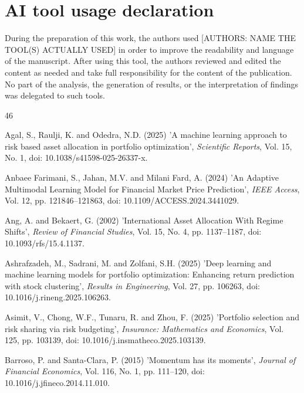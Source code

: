 \documentclass{singlecol-new}
\theoremstyle{TH}{
\newtheorem{lemma}{Lemma}
\newtheorem{theorem}[lemma]{Theorem}
\newtheorem{corrolary}[lemma]{Corrolary}
\newtheorem{conjecture}[lemma]{Conjecture}
\newtheorem{proposition}[lemma]{Proposition}
\newtheorem{claim}[lemma]{Claim}
\newtheorem{stheorem}[lemma]{Wrong Theorem}
\newtheorem{algorithm}{Algorithm}
}
\theoremstyle{THrm}{
\newtheorem{definition}{Definition}[section]
\newtheorem{question}{Question}[section]
\newtheorem{remark}{Remark}
\newtheorem{scheme}{Scheme}
}
\theoremstyle{THhit}{
\newtheorem{case}{Case}[section]
}
\begin{document}
\section*{AI tool usage declaration}
During the preparation of this work, the authors used [AUTHORS: NAME THE TOOL(S)
ACTUALLY USED] in order to improve the readability and language of the manuscript. After
using this tool, the authors reviewed and edited the content as needed and take full
responsibility for the content of the publication. No part of the analysis, the
generation of results, or the interpretation of findings was delegated to such tools.

\label{sec:refs}
\begin{thebibliography}{46}

Agal, S., Raulji, K. and Odedra, N.D. (2025) 'A machine learning approach to risk based asset allocation in portfolio optimization', {\it Scientific Reports}, Vol. 15, No. 1, doi: 10.1038/s41598-025-26337-x.

Anbaee Farimani, S., Jahan, M.V. and Milani Fard, A. (2024) 'An Adaptive Multimodal Learning Model for Financial Market Price Prediction', {\it IEEE Access}, Vol. 12, pp. 121846--121863, doi: 10.1109/ACCESS.2024.3441029.

Ang, A. and Bekaert, G. (2002) 'International Asset Allocation With Regime Shifts', {\it Review of Financial Studies}, Vol. 15, No. 4, pp. 1137--1187, doi: 10.1093/rfs/15.4.1137.

Ashrafzadeh, M., Sadrani, M. and Zolfani, S.H. (2025) 'Deep learning and machine learning models for portfolio optimization: Enhancing return prediction with stock clustering', {\it Results in Engineering}, Vol. 27, pp. 106263, doi: 10.1016/j.rineng.2025.106263.

Asimit, V., Chong, W.F., Tunaru, R. and Zhou, F. (2025) 'Portfolio selection and risk sharing via risk budgeting', {\it Insurance: Mathematics and Economics}, Vol. 125, pp. 103139, doi: 10.1016/j.insmatheco.2025.103139.

Barroso, P. and Santa-Clara, P. (2015) 'Momentum has its moments', {\it Journal of Financial Economics}, Vol. 116, No. 1, pp. 111--120, doi: 10.1016/j.jfineco.2014.11.010.


\end{thebibliography}
\end{document}
